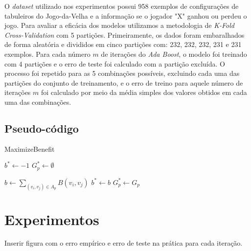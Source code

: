 \documentclass{article}
\begin{document}
O \textit{dataset} utilizado nos experimentos possui 958 exemplos de configurações de tabuleiros
do Jogo-da-Velha e a informação se o jogador "X" ganhou ou perdeu o jogo. Para avaliar a eficácia 
dos modelos utilizamos a metodologia de \textit{K-Fold Cross-Validation} com 5 partições. Primeiramente,
os dados foram embaralhados de forma aleatória e divididos em cinco partições com: 232, 232, 
232, 231 e 231 exemplos. Para cada número $ m $ de iterações do \textit{Ada Boost}, o modelo foi
treinado com 4 partições e o erro de teste foi calculado com a partição excluída. O processo
foi repetido para as 5 combinações possíveis, excluindo cada uma das partições do conjunto de treinamento, e 
o erro de treino para aquele número de iterações $ m $ foi calculado por meio da média simples 
dos valores obtidos em cada uma das combinações.

\subsection{Pseudo-código}

\begin{algorithm}
\caption{MaximizeBenefit}
\begin{algorithmic}[1]

\State $ b^* \gets -1 $
\State $ G_p^* \gets \emptyset $
\item {}

  \State $ \textit{b} \gets \sum_{(v_i, v_j) \in A_p} B(v_i, v_j) $
    \State $ b^* \gets b $
    \State $ G_p^* \gets G_p $
  \EndIf
\EndIf
\EndFor
\EndProcedure
\end{algorithmic}
\label{alg:alg_1}
\end{algorithm}

\section{Experimentos}

Inserir figura com o erro empírico e erro de teste na prática para cada iteração.

\end{document}
